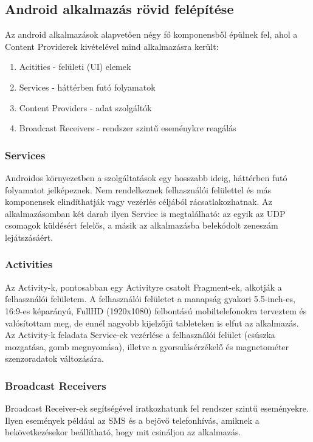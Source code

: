 \documentclass[../main.tex]{subfiles}
\begin{document}
    \subsection{Android alkalmazás rövid felépítése} %
        Az android alkalmazások alapvetően négy fő komponensből épülnek fel, ahol a Content Providerek kivételével mind alkalmazásra került\cite{android_app_fund}:
        \begin{enumerate}
            \item Acitities - felületi (UI) elemek
            \item Services - háttérben futó folyamatok
            \item Content Providers - adat szolgáltók
            \item Broadcast Receivers - rendszer szintű eseménykre reagálás
        \end{enumerate}
        
        \subsubsection{Services}
            Androidos környezetben a szolgáltatások egy hosszabb ideig, háttérben futó folyamatot jelképeznek. Nem rendelkeznek felhasználói felülettel és más komponensek elindíthatják vagy vezérlés céljából rácsatlakozhatnak. Az alkalmazásomban két darab ilyen Service is megtalálható: az egyik az UDP csomagok küldésért felelős, a másik az alkalmazásba belekódolt zeneszám lejátszásáért.
        
        \subsubsection{Activities}
            Az Activity-k, pontosabban egy Activityre csatolt Fragment-ek, alkotják a felhasználói felületem. A felhasználói felületet a manapság gyakori 5.5-inch-es, 16:9-es képarányú, FullHD (1920x1080) felbontású mobiltelefonokra terveztem és valósítottam meg, de ennél nagyobb kijelzőjű tableteken is elfut az alkalmazás. Az Activity-k feladata Service-ek vezérlése a felhasználói felület (csúszka mozgatása, gomb megnyomása), illetve a gyorsulásérzékelő és magnetométer szenzoradatok változására. 
            
        \subsubsection{Broadcast Receivers}
            Broadcast Receiver-ek segítségével iratkozhatunk fel rendszer szintű eseményekre. Ilyen események például az SMS és a bejövő telefonhívás, amiknek a bekövetkezésekor beállítható, hogy mit csináljon az alkalmazás. 
    
\end{document}
